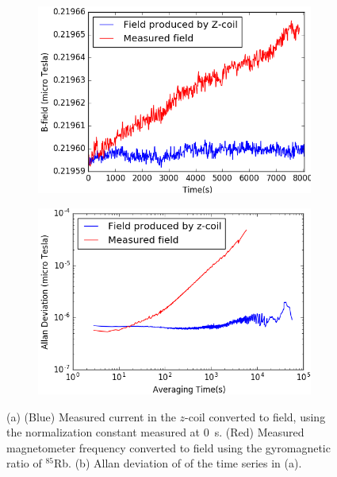 \begin{figure}
  \centering
  \begin{subfigure}[b]{0.67\textwidth}
    \centering
    \includegraphics[width=\textwidth]{figures/field_coil_current.png}
    \caption{}
    \label{fig:field_measure_and_produced}
  \end{subfigure}
  \begin{subfigure}[b]{0.65\textwidth}
    \centering
    \includegraphics[width=\textwidth]{figures/field_current_allan_plot.png}
    \caption{}
    \label{fig:allan_plot}
  \end{subfigure}
  \caption{(a) (Blue) Measured current in the $z$-coil converted to
    field, using the normalization constant measured at 0~s.  (Red)
    Measured magnetometer frequency converted to field using the
    gyromagnetic ratio of $^{85}$Rb.  (b) Allan deviation of of the
    time series in (a).}
  \label{fig:current_vs_field_allan_deviation}
\end{figure} 

